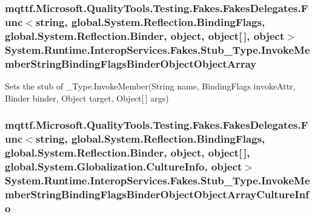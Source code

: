 \hypertarget{class_system_1_1_runtime_1_1_interop_services_1_1_fakes_1_1_stub___type_a9efe8e67fb7523819d6a81a3bcb59d6c}{
\subsubsection[{Invoke\-Member\-String\-Binding\-Flags\-Binder\-Object\-Object\-Array}]{\setlength{\rightskip}{0pt plus 5cm}mqttf.\-Microsoft.\-Quality\-Tools.\-Testing.\-Fakes.\-Fakes\-Delegates.\-Func$<$string, global.\-System.\-Reflection.\-Binding\-Flags, global.\-System.\-Reflection.\-Binder, object, object\mbox{[}$\,$\mbox{]}, object$>$ System.\-Runtime.\-Interop\-Services.\-Fakes.\-Stub\-\_\-\-Type.\-Invoke\-Member\-String\-Binding\-Flags\-Binder\-Object\-Object\-Array}}\label{class_system_1_1_runtime_1_1_interop_services_1_1_fakes_1_1_stub___type_a9efe8e67fb7523819d6a81a3bcb59d6c}


Sets the stub of \-\_\-\-Type.\-Invoke\-Member(\-String name, Binding\-Flags invoke\-Attr, Binder binder, Object target, Object\mbox{[}$\,$\mbox{]} args)

\hypertarget{class_system_1_1_runtime_1_1_interop_services_1_1_fakes_1_1_stub___type_a07c3c157fd6220015a4152ec83316c86}{
\subsubsection[{Invoke\-Member\-String\-Binding\-Flags\-Binder\-Object\-Object\-Array\-Culture\-Info}]{\setlength{\rightskip}{0pt plus 5cm}mqttf.\-Microsoft.\-Quality\-Tools.\-Testing.\-Fakes.\-Fakes\-Delegates.\-Func$<$string, global.\-System.\-Reflection.\-Binding\-Flags, global.\-System.\-Reflection.\-Binder, object, object\mbox{[}$\,$\mbox{]}, global.\-System.\-Globalization.\-Culture\-Info, object$>$ System.\-Runtime.\-Interop\-Services.\-Fakes.\-Stub\-\_\-\-Type.\-Invoke\-Member\-String\-Binding\-Flags\-Binder\-Object\-Object\-Array\-Culture\-Info}}\label{class_system_1_1_runtime_1_1_interop_services_1_1_fakes_1_1_stub___type_a07c3c157fd6220015a4152ec83316c86}


